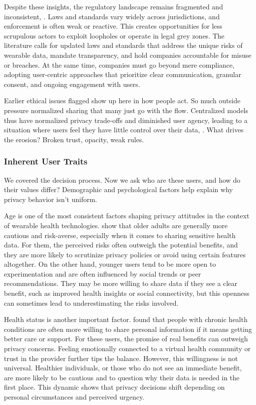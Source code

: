 	Despite these insights, the regulatory landscape remains fragmented and inconsistent, \cite{Hummel2021}. Laws and standards vary widely across jurisdictions, and enforcement is often weak or reactive. This creates opportunities for less scrupulous actors to exploit loopholes or operate in legal grey zones. The literature calls for updated laws and standards that address the unique risks of wearable data, mandate transparency, and hold companies accountable for misuse or breaches. At the same time, companies must go beyond mere compliance, adopting user-centric approaches that prioritize clear communication, granular consent, and ongoing engagement with users.

	Earlier ethical issues flagged show up here in how people act. So much outside pressure normalized sharing that many just go with the flow. Centralized models thus have normalized privacy trade-offs and diminished user agency, leading to a situation where users feel they have little control over their data, \cite{VanDijck2014}. What drives the erosion? Broken trust, opacity, weak rules.
	\subsubsection{Inherent User Traits}

	We covered the decision process. Now we ask who are these users, and how do their values differ? Demographic and psychological factors help explain why privacy behavior isn't uniform.

	Age is one of the most consistent factors shaping privacy attitudes in the context of wearable health technologies. \cite{Kim2021} show that older adults are generally more cautious and risk-averse, especially when it comes to sharing sensitive health data. For them, the perceived risks often outweigh the potential benefits, and they are more likely to scrutinize privacy policies or avoid using certain features altogether. On the other hand, younger users tend to be more open to experimentation and are often influenced by social trends or peer recommendations. They may be more willing to share data if they see a clear benefit, such as improved health insights or social connectivity, but this openness can sometimes lead to underestimating the risks involved.

	Health status is another important factor. \cite{Kordzadeh2016} found that people with chronic health conditions are often more willing to share personal information if it means getting better care or support. For these users, the promise of real benefits can outweigh privacy concerns. Feeling emotionally connected to a virtual health community or trust in the provider further tips the balance. However, this willingness is not universal. Healthier individuals, or those who do not see an immediate benefit, are more likely to be cautious and to question why their data is needed in the first place. This dynamic shows that privacy decisions shift depending on personal circumstances and perceived urgency.

